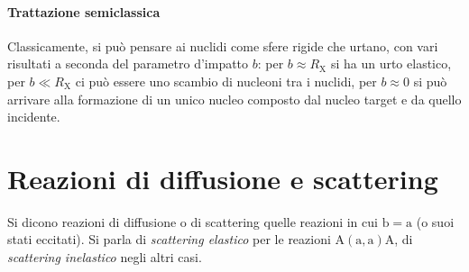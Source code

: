 \paragraph{Trattazione semiclassica}

Classicamente, si può pensare ai nuclidi come sfere rigide che urtano, con vari risultati a seconda del parametro d'impatto $ b $: per $ b \approx R_{\mathrm{X}} $ si ha un urto elastico, per $ b \ll R_{\mathrm{X}} $ ci può essere uno scambio di nucleoni tra i nuclidi, per $ b \approx 0 $ si può arrivare alla formazione di un unico nucleo composto dal nucleo target e da quello incidente.

\section{Reazioni di diffusione e scattering}

Si dicono reazioni di diffusione o di scattering quelle reazioni in cui $ \mathrm{b} = \mathrm{a} $ (o suoi stati eccitati). Si parla di \textit{scattering elastico} per le reazioni $ \mathrm{A} \left( \mathrm{a},\mathrm{a} \right) \mathrm{A} $, di \textit{scattering inelastico} negli altri casi.











